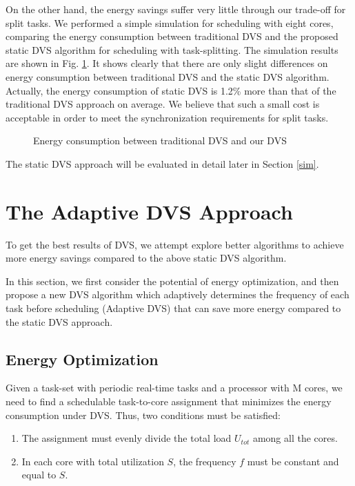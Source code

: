 \documentclass[12pt, journal,compsoc]{IEEEtran}
\begin{document}
On the other hand, the energy savings suffer very little through our trade-off for split tasks. We performed a simple simulation for scheduling with eight cores, comparing the energy consumption between traditional DVS and the proposed static DVS algorithm for scheduling with task-splitting. The simulation results are shown in Fig. \ref{TDOD}. It shows clearly that there are only slight differences on energy consumption between traditional DVS and the static DVS algorithm. Actually, the energy consumption of static DVS is 1.2\% more than that of the traditional DVS approach on average. We believe that such a small cost is acceptable in order to meet the synchronization requirements for split tasks.


\begin{figure}[!t]
\centering
{}
\hspace{-0.2in}
\caption{Energy consumption between traditional DVS and our DVS}
\label{TDOD}
\end{figure}

The static DVS approach will be evaluated in detail later in Section \ref{sim}.


\section{The Adaptive DVS Approach}
\label{pre}

To get the best results of DVS, we attempt explore better algorithms to achieve more energy savings compared to the above static DVS algorithm.

In this section, we first consider the potential of energy optimization, and then propose a new DVS algorithm which adaptively determines the frequency of each task before scheduling (Adaptive DVS) that can save more energy compared to the static DVS approach.

\subsection{Energy Optimization}

Given a task-set with periodic real-time tasks and a processor with M cores, we need to find a schedulable task-to-core assignment that minimizes the energy consumption under DVS. Thus, two conditions \cite{Aydin:2003:EPM:838237.838347} must be satisfied:

\begin{enumerate}
\item The assignment must evenly divide the total load $U_{tot}$ among all the cores.
\item In each core with total utilization $S$, the frequency $f$ must be constant and equal to $S$.
\end{enumerate}
\end{document}
